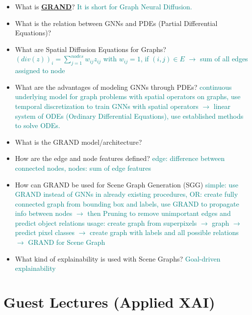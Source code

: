 \documentclass{report}
\newcommand{\asw}[2][teal]{}
\renewcommand{\asw}[2][teal]{\textcolor{#1}{#2}}
\begin{document}
\begin{itemize}
	\item What is \textbf{\underline{GRAND}}?
	\asw{\newline It is short for Graph Neural Diffusion.}
	\item What is the relation between GNNs and PDEs (Partial Differential Equations)?
	\asw{\newline }
	\item What are Spatial Diffusion Equations for Graphs?
	\asw{\newline $(div(z))_i = \sum_{j=1}^{nodes} w_{ij} z_{ij}$ with $w_{ij} = 1$, if $(i,j) \in E$ $\rightarrow$ sum of all edges assigned to node}
	\item What are the advantages of modeling GNNs through PDEs?
	\asw{\newline continuous underlying model for graph problems
		\newline with spatial operators on graphs, use temporal discretization to train GNNs
		\newline with spatial operators $\rightarrow$ linear system of ODEs (Ordinary Differential Equations), use established methods to solve ODEs.}
	\item What is the GRAND model/architecture?
	\asw{\newline }
	\item How are the edge and node features defined?
	\asw{\newline edge: difference between connected nodes, nodes: sum of edge features}
	\item How can GRAND be used for Scene Graph Generation (SGG)
	\asw{\newline simple: use GRAND instead of GNNs in already existing procedures,
		\newline OR: create fully connected graph from bounding box and labels, use GRAND to propagate info between nodes $\rightarrow$ then Pruning to remove unimportant edges and predict object relations
		\newline usage: create graph from superpixels
		\newline $\rightarrow$ graph $\rightarrow$ predict pixel classes $\rightarrow$ create graph with labels and all possible relations $\rightarrow$ GRAND for Scene Graph}
	\item What kind of explainability is used with Scene Graphs?
	\asw{\newline Goal-driven explainability}
	\end{itemize}
	\newpage

	\section{Guest Lectures (Applied XAI)}
	
\end{document}
